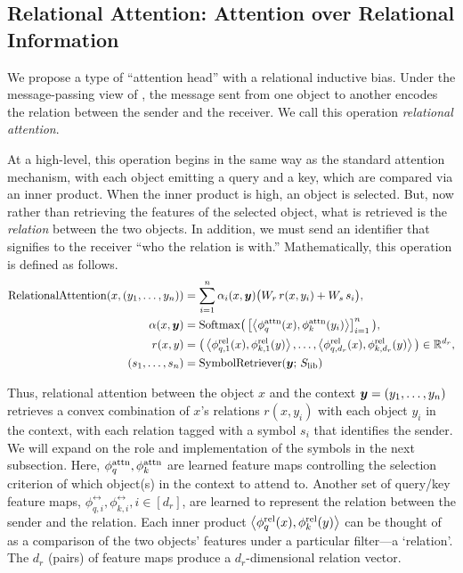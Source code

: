 \subsection{Relational Attention: Attention over Relational Information}

We propose a type of ``attention head'' with a relational inductive bias. Under the message-passing view of , the message sent from one object to another encodes the relation between the sender and the receiver. We call this operation \textit{relational attention}.

At a high-level, this operation begins in the same way as the standard attention mechanism, with each object emitting a query and a key, which are compared via an inner product. When the inner product is high, an object is selected. But, now rather than retrieving the features of the selected object, what is retrieved is the \textit{relation} between the two objects. In addition, we must send an identifier that signifies to the receiver ``who the relation is with.'' Mathematically, this operation is defined as follows.
\begin{equation}\label{eq:rel_attn}
  \begin{split}
    \mathrm{RelationalAttention}(x, (y_1, \ldots, y_n)) &= \sum_{i=1}^{n} \alpha_i(x, \bm{y}) \big(W_r \, r(x, y_i) + W_s \, s_i\big), \\
    \alpha(x, \bm{y}) &= \mathrm{Softmax}\big(\left[\left \langle \phi_q^{\mathrm{attn}}(x), \phi_k^{\mathrm{attn}}(y_i) \right\rangle\right]_{i=1}^{n}\big), \\
    r(x, y) &= \big(\left \langle \phi_{q,1}^{\mathrm{rel}}(x), \phi_{k,1}^{\mathrm{rel}}(y) \right\rangle, \ldots, \left \langle \phi_{q, d_r}^{\mathrm{rel}}(x), \phi_{k, d_r}^{\mathrm{rel}}(y) \right\rangle\big) \in \mathbb{R}^{d_r}, \\
    (s_1, \ldots, s_n) &= \mathrm{SymbolRetriever}(\bm{y};\,S_\mathrm{lib})
  \end{split}
\end{equation}

Thus, relational attention between the object $x$ and the context $\bm{y} = (y_1, \ldots, y_n)$ retrieves a convex combination of $x$'s relations $r(x, y_i)$ with each object $y_i$ in the context, with each relation tagged with a symbol $s_i$ that identifies the sender. We will expand on the role and implementation of the symbols in the next subsection. Here, $\phi_q^{\mathrm{attn}}, \phi_k^{\mathrm{attn}}$ are learned feature maps controlling the selection criterion of which object(s) in the context to attend to. Another set of query/key feature maps, $\phi_{q,i}^{\rel}, \phi_{k,i}^{\rel}, i \in [d_r]$, are learned to represent the relation between the sender and the relation. Each inner product $\left \langle \phi_q^{\mathrm{rel}}(x), \phi_k^{\mathrm{rel}}(y) \right\rangle$ can be thought of as a comparison of the two objects' features under a particular filter---a `relation'. The $d_r$ (pairs) of feature maps produce a $d_r$-dimensional relation vector.

